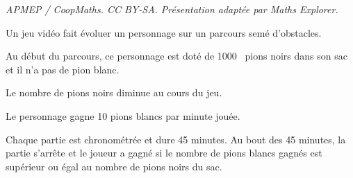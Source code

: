 \documentclass[10pt]{article}
\providecommand{\np}[2][]{{#2~#1}}
\begin{document}
\noindent\textit{APMEP / CoopMaths. CC BY-SA. Présentation adaptée par Maths Explorer.}\par\medskip
\medskip

Un jeu vidéo fait évoluer un personnage sur un parcours semé d'obstacles.

Au début du parcours, ce personnage est doté de \np{1000} pions noirs dans son sac et il
n'a pas de pion blanc.

Le nombre de pions noirs diminue au cours du jeu.

Le personnage gagne 10 pions blancs par minute jouée.

Chaque partie est chronométrée et dure 45 minutes. Au bout des 45 minutes, la
partie s'arrête et le joueur a gagné si le nombre de pions blancs gagnés est supérieur
ou égal au nombre de pions noirs du sac.

\medskip
\end{document}
